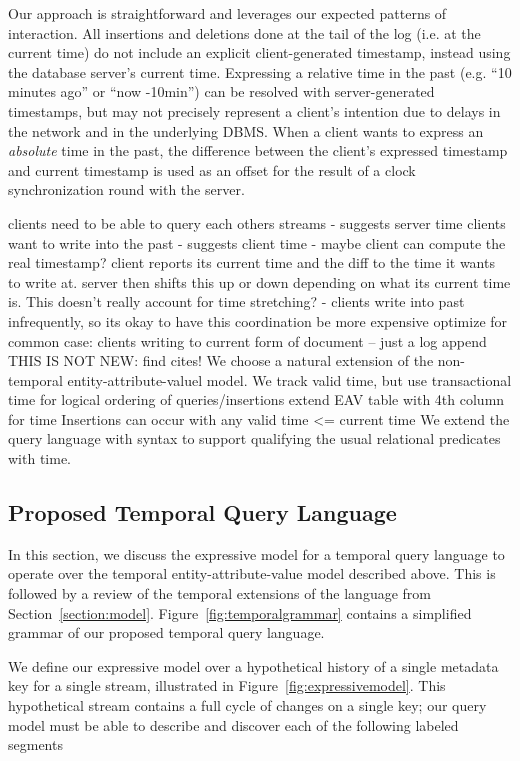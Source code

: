 Our approach is straightforward and leverages our expected patterns of interaction.
All insertions and deletions done at the tail of the log (i.e. at the current time)
do not include an explicit client-generated timestamp, instead using the database server's current
time. Expressing a relative time in the past (e.g. ``10 minutes ago'' or ``now -10min'')
can be resolved with server-generated timestamps, but may not precisely represent
a client's intention due to delays in the network and in the underlying DBMS.
When a client wants to express an \emph{absolute} time in the past, the difference
between the client's expressed timestamp and current timestamp is used as an offset
for the result of a clock synchronization round with the server.

clients need to be able to query each others streams
    - suggests server time
clients want to write into the past
    - suggests client time
    - maybe client can compute the real timestamp?
        client reports its current time and the diff to the time it wants to write at.
        server then shifts this up or down depending on what its current time is.
        This doesn't really account for time stretching?
    - clients write into past infrequently, so its okay to have this coordination be more expensive
optimize for common case: clients writing to current form of document -- just a log append
\fi
{}
THIS IS NOT NEW: find cites!
We choose a natural extension of the non-temporal entity-attribute-valuel model.
We track valid time, but use transactional time for logical ordering of queries/insertions
extend EAV table with 4th column for time
Insertions can occur with any valid time <= current time
We extend the query language with syntax to support qualifying the usual
relational predicates with time.
\fi

\subsection{Proposed Temporal Query Language}

In this section, we discuss the expressive model for a temporal query language to operate
over the temporal entity-attribute-value model described above. This is followed by a review
of the temporal extensions of the language from Section~\ref{section:model}.
Figure~\ref{fig:temporalgrammar} contains a simplified grammar of our proposed temporal query language.

We define our expressive model over a hypothetical history of a single metadata key for a single stream, illustrated
in Figure~\ref{fig:expressivemodel}. This hypothetical stream contains a full cycle of changes on a single key; our query
model must be able to describe and discover each of the following labeled segments

